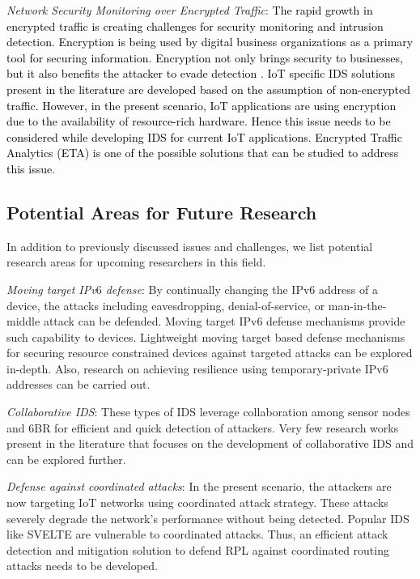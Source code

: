 \documentclass[10pt,journal,sort & compress]{IEEEtran}
\begin{document}
\textit{Network Security Monitoring over Encrypted Traffic}: \textcolor{black}{The rapid growth in encrypted traffic is creating challenges for security monitoring and intrusion detection. Encryption is being used by digital business organizations as a primary tool for securing information. Encryption not only brings security to businesses, but it also benefits the attacker to evade detection \cite{apthorpe2017spying}. IoT specific IDS solutions present in the literature are developed based on the assumption of non-encrypted traffic. However, in the present scenario, IoT applications are using encryption due to the availability of resource-rich hardware. Hence this issue needs to be considered while developing IDS for current IoT applications. Encrypted Traffic Analytics (ETA) is one of the possible solutions that can be studied to address this issue.}

\subsection{Potential Areas for Future Research} 
In addition to previously discussed issues and challenges, we list potential research areas for upcoming researchers in this field.

\textit{Moving target IPv$ 6 $ defense}: By continually changing the IPv6 address of a device, the attacks including eavesdropping, denial-of-service, or man-in-the-middle attack can be defended. Moving target IPv$ 6 $ defense mechanisms provide such capability to devices. Lightweight moving target based defense mechanisms for securing resource constrained devices against targeted attacks can be explored in-depth. Also, research on achieving resilience using temporary-private IPv$ 6 $ addresses \cite{Mavani2019} can be carried out. 

\textit{Collaborative IDS}: These types of IDS leverage collaboration among sensor nodes and $ 6 $BR for efficient and quick detection of attackers. Very few research works present in the literature that focuses on the development of collaborative IDS and can be explored further.

\textit{Defense against coordinated attacks}: In the present scenario, the attackers are now targeting IoT networks using coordinated attack strategy. These attacks severely degrade the network's performance without being detected. Popular IDS like SVELTE \cite{RAZA20132661} are vulnerable to coordinated attacks. Thus, an efficient attack detection and mitigation solution to defend RPL against coordinated routing attacks needs to be developed.
\end{document}
